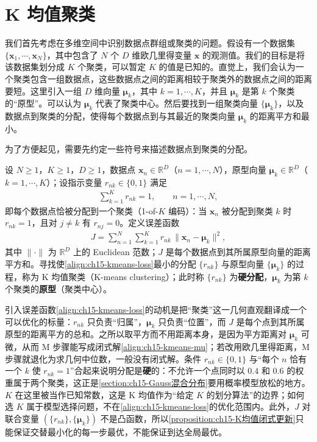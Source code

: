 \documentclass[../../main.tex]{subfiles}
\begin{document}
\section{K 均值聚类}\label{section:ch15-K均值聚类}

我们首先考虑在多维空间中识别数据点群组或聚类的问题。假设有一个数据集 $\{\bm{x}_1,\cdots,\bm{x}_N\}$，其中包含了 $N$ 个 $D$ 维欧几里得变量 $\bm{x}$ 的观测值。我们的目标是将该数据集划分成 $K$ 个聚类，可以暂定 $K$ 的值是已知的。直觉上，我们会认为一个聚类包含一组数据点，这些数据点之间的距离相较于聚类外的数据点之间的距离要短。这里引入一组 $D$ 维向量 $\bm{\mu}_k$，其中 $k=1,\cdots,K$，并且 $\bm{\mu}_k$ 是第 $k$ 个聚类的“原型”。可以认为 $\bm{\mu}_k$ 代表了聚类中心。然后要找到一组聚类向量 $\{\bm{\mu}_k\}$，以及数据点到聚类的分配，使得每个数据点到与其最近的聚类向量 $\bm{\mu}_k$ 的距离平方和最小。

为了方便起见，需要先约定一些符号来描述数据点到聚类的分配。

\begin{definition}[K 均值聚类]\label{definition:ch15-K均值聚类}
设 $N\geqslant1$，$K\geqslant1$，$D\geqslant1$，数据点 $\bm{x}_n\in\mathbb{R}^{D}$（$n=1,\cdots,N$），原型向量 $\bm{\mu}_k\in\mathbb{R}^{D}$（$k=1,\cdots,K$）；设指示变量 $r_{nk}\in\{0,1\}$ 满足
\begin{align*}
\sum_{k=1}^{K}r_{nk}=1,\qquad n=1,\cdots,N,
\end{align*}
即每个数据点恰被分配到一个聚类（1-of-$K$ 编码）：当 $\bm{x}_n$ 被分配到聚类 $k$ 时 $r_{nk}=1$，且对 $j\neq k$ 有 $r_{nj}=0$。定义误差函数
\begin{align}
J=\sum_{n=1}^{N}\sum_{k=1}^{K}r_{nk}\,\|\bm{x}_n-\bm{\mu}_k\|^{2},
\label{align:ch15-kmeans-loss}
\end{align}
其中 $\|\cdot\|$ 为 $\mathbb{R}^{D}$ 上的 Euclidean 范数；$J$ 是每个数据点到其所属原型向量的距离平方和。寻找使\eqref{align:ch15-kmeans-loss}最小的分配 $\{r_{nk}\}$ 与原型向量 $\{\bm{\mu}_k\}$ 的过程，称为 K 均值聚类（K-means clustering）；此时称 $\{r_{nk}\}$ 为\textbf{硬分配}，$\bm{\mu}_k$ 为第 $k$ 个聚类的\textbf{原型}（聚类中心）。
\end{definition}

\begin{remark}
引入误差函数\eqref{align:ch15-kmeans-loss}的动机是把“聚类”这一几何直观翻译成一个可以优化的标量：$r_{nk}$ 只负责“归属”，$\bm{\mu}_k$ 只负责“位置”，而 $J$ 是每个点到其所属原型的距离平方的总和。之所以取平方而不用距离本身，是因为平方距离对 $\bm{\mu}_k$ 可微，从而 M 步骤能写成闭式解\eqref{align:ch15-kmeans-mu}；若改用欧几里得距离，M 步骤就退化为求几何中位数，一般没有闭式解。条件 $r_{nk}\in\{0,1\}$ 与“每个 $n$ 恰有一个 $k$ 使 $r_{nk}=1$”合起来说明分配是\textbf{硬}的：不允许一个点同时以 $0.4$ 和 $0.6$ 的权重属于两个聚类，这正是\cref{section:ch15-Gauss混合分布}要用概率模型放松的地方。$K$ 在这里被当作已知常数，这是 K 均值作为“给定 $K$ 的划分算法”的边界；如何选 $K$ 属于模型选择问题，不在\eqref{align:ch15-kmeans-loss}的优化范围内。此外，$J$ 对联合变量 $(\{r_{nk}\},\{\bm{\mu}_k\})$ 不是凸函数，所以\cref{proposition:ch15-K均值闭式更新}只能保证交替最小化的每一步最优，不能保证到达全局最优。
\end{remark}
\end{document}
